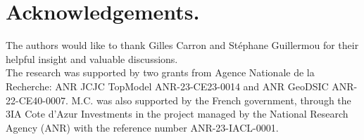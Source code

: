 \documentclass{article}
\newcommand{\bert}[1]{\noindent \textcolor{blue}{\textsf{[B: #1]}}}
\begin{document}
\section{Acknowledgements. }



The authors would like to thank Gilles Carron and Stéphane Guillermou for their helpful insight and valuable discussions.\\
The research was supported by two grants from Agence Nationale de la Recherche: ANR JCJC TopModel ANR-23-CE23-0014 and ANR GeoDSIC ANR-22-CE40-0007.
M.C. was also supported by the French government, through the 3IA Cote d’Azur Investments in the project
managed by the National Research Agency (ANR) with the reference number ANR-23-IACL-0001.

\newpage
\appendix

%

 



\printbibliography
\end{document}
